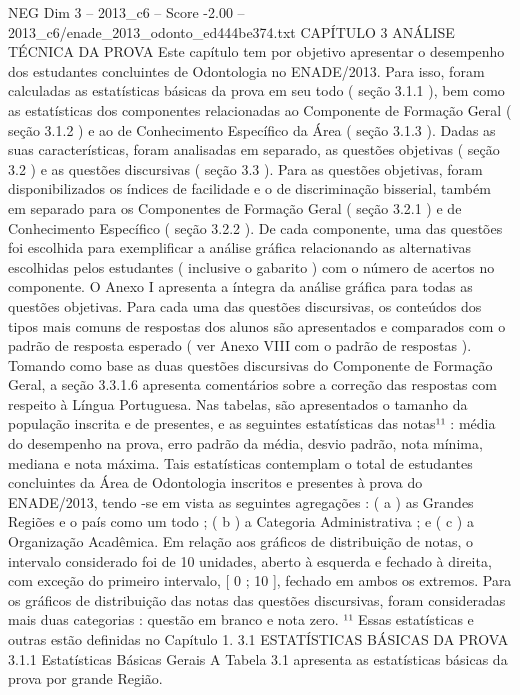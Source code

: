 \begin{textsample}{NEG Dim 3 – 2013\_c6 – Score -2.00 – 2013\_c6/enade\_2013\_odonto\_ed444be374.txt}  \label{ex:f3_neg_059}
CAPÍTULO 3 ANÁLISE TÉCNICA DA PROVA Este capítulo tem por objetivo apresentar o desempenho dos estudantes concluintes de Odontologia no ENADE/2013.
Para isso, foram calculadas as estatísticas básicas da prova em seu todo ( seção 3.1.1 ), bem como as estatísticas dos componentes relacionadas ao Componente de Formação Geral ( seção 3.1.2 ) e ao de Conhecimento Específico da Área ( seção 3.1.3 ).
Dadas as suas características, foram analisadas em separado, as questões objetivas ( seção 3.2 ) e as questões discursivas ( seção 3.3 ).
Para as questões objetivas, foram disponibilizados os índices de facilidade e o de discriminação bisserial, também em separado para os Componentes de Formação Geral ( seção 3.2.1 ) e de Conhecimento Específico ( seção 3.2.2 ).
De cada componente, uma das questões foi escolhida para exemplificar a análise gráfica relacionando as alternativas escolhidas pelos estudantes ( inclusive o gabarito ) com o número de acertos no componente.
O Anexo I apresenta a íntegra da análise gráfica para todas as questões objetivas.
Para cada uma das questões discursivas, os conteúdos dos tipos mais comuns de respostas dos alunos são apresentados e comparados com o padrão de resposta esperado ( ver Anexo VIII com o padrão de respostas ).
Tomando como base as duas questões discursivas do Componente de Formação Geral, a seção 3.3.1.6 apresenta comentários sobre a correção das respostas com respeito à Língua Portuguesa.
Nas tabelas, são apresentados o tamanho da população inscrita e de presentes, e as seguintes estatísticas das notas¹¹ : média do desempenho na prova, erro padrão da média, desvio padrão, nota mínima, mediana e nota máxima.
Tais estatísticas contemplam o total de estudantes concluintes da Área de Odontologia inscritos e presentes à prova do ENADE/2013, tendo -se em vista as seguintes agregações : ( a ) as Grandes Regiões e o país como um todo ; ( b ) a Categoria Administrativa ; e ( c ) a Organização Acadêmica.
Em relação aos gráficos de distribuição de notas, o intervalo considerado foi de 10 unidades, aberto à esquerda e fechado à direita, com exceção do primeiro intervalo, [ 0 ; 10 ], fechado em ambos os extremos.
Para os gráficos de distribuição das notas das questões discursivas, foram consideradas mais duas categorias : questão em branco e nota zero. ¹¹ Essas estatísticas e outras estão definidas no Capítulo 1. 3.1 ESTATÍSTICAS BÁSICAS DA PROVA 3.1.1 Estatísticas Básicas Gerais A Tabela 3.1 apresenta as estatísticas básicas da prova por grande Região.

\end{textsample}
